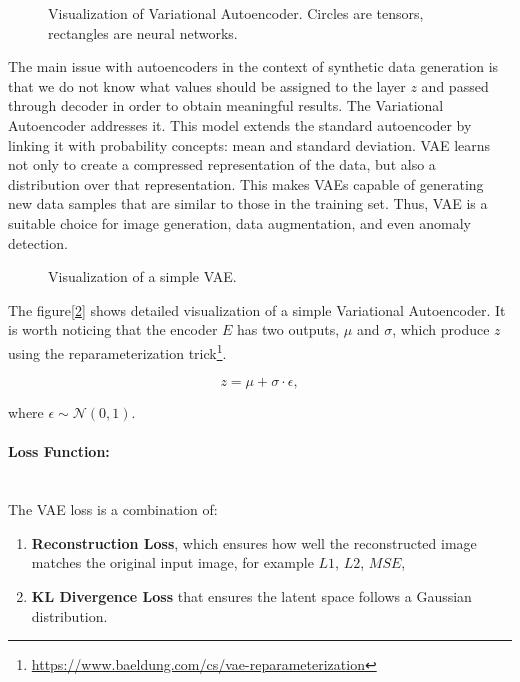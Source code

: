 \begin{figure}[H]
    \centering
    
    \caption{Visualization of Variational Autoencoder. Circles are tensors, rectangles are neural networks.}
    \label{fig:vae}
\end{figure}

\indent The main issue with autoencoders in the context of synthetic data generation is that we do not know what values should be assigned to the layer $z$ and passed through decoder in order to obtain meaningful results. The Variational Autoencoder addresses it.
This model extends the standard autoencoder by linking it with probability concepts: mean and standard deviation. VAE learns not only to create a compressed representation of the data, but also a distribution over that representation. This makes VAEs capable of generating new data samples that are similar to those in the training set. Thus, VAE is a suitable choice for image generation, data augmentation, and even anomaly detection.

\begin{figure}[H]
    \centering
    
    \caption{Visualization of a simple VAE.}
    \label{fig:vae-simple}
\end{figure}

The figure[\ref{fig:vae-simple}] shows detailed visualization of a simple Variational Autoencoder. It is worth noticing that the encoder $E$ has two outputs, $\mu$ and $\sigma$, which produce $z$ using the reparameterization trick\footnote{\url{https://www.baeldung.com/cs/vae-reparameterization}}.

\begin{equation}
    z = \mu + \sigma\cdot\epsilon,
\end{equation}

where $\epsilon\sim\mathcal{N}(0,1)$.

\paragraph{Loss Function:}\mbox{}\\
The VAE loss is a combination of:
\begin{enumerate}
\item \textbf{Reconstruction Loss}, which ensures how well the reconstructed image matches the original input image, for example $L1$, $L2$, $MSE$,
\item \textbf{KL Divergence Loss} that ensures the latent space follows a Gaussian distribution.
\end{enumerate}

